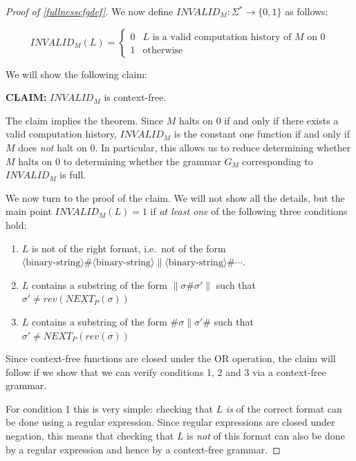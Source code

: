 \begin{proof}[Proof of \cref{fullnesscfgdef}]
We now define
\(\ensuremath{\mathit{INVALID}}_M:\Sigma^* \rightarrow \{0,1\}\) as
follows:

\[\ensuremath{\mathit{INVALID}}_M(L) = \begin{cases}0 & \text{$L$ is a valid computation history of $M$ on $0$} \\
                            1 & \text{otherwise} \end{cases}
\]

We will show the following claim:

\textbf{CLAIM:} \(\ensuremath{\mathit{INVALID}}_M\) is context-free.

The claim implies the theorem. Since \(M\) halts on \(0\) if and only if
there exists a valid computation history,
\(\ensuremath{\mathit{INVALID}}_M\) is the constant one function if and
only if \(M\) does \emph{not} halt on \(0\). In particular, this allows
us to reduce determining whether \(M\) halts on \(0\) to determining
whether the grammar \(G_M\) corresponding to
\(\ensuremath{\mathit{INVALID}}_M\) is full.

We now turn to the proof of the claim. We will not show all the details,
but the main point \(\ensuremath{\mathit{INVALID}}_M(L)=1\) if \emph{at
least one} of the following three conditions hold:

\begin{enumerate}
\def\labelenumi{\arabic{enumi}.}
\item
  \(L\) is not of the right format, i.e.~not of the form
  \(\langle \text{binary-string} \rangle \# \langle \text{binary-string} \rangle \| \langle \text{binary-string} \rangle \# \cdots\).
\item
  \(L\) contains a substring of the form \(\| \sigma \# \sigma' \|\)
  such that \(\sigma' \neq rev(\ensuremath{\mathit{NEXT}}_P(\sigma))\)
\item
  \(L\) contains a substring of the form \(\# \sigma \| \sigma' \#\)
  such that \(\sigma' \neq \ensuremath{\mathit{NEXT}}_P(rev(\sigma))\)
\end{enumerate}

Since context-free functions are closed under the OR operation, the
claim will follow if we show that we can verify conditions 1, 2 and 3
via a context-free grammar.

For condition 1 this is very simple: checking that \(L\) \emph{is} of
the correct format can be done using a regular expression. Since regular
expressions are closed under negation, this means that checking that
\(L\) is \emph{not} of this format can also be done by a regular
expression and hence by a context-free grammar.


\end{proof}
